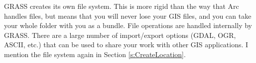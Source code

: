 \documentclass{book}
\begin{document}
GRASS creates its own file system. This is more rigid than the way that Arc handles files, but means that you will never lose your GIS files, and you can take your whole folder with you as a bundle. File operations are handled internally by GRASS. There are a large number of import/export options (GDAL, OGR, ASCII, etc.) that can be used to share your work with other GIS applications. I mention the file system again in Section \ref{s:CreateLocation}.

\end{document}
